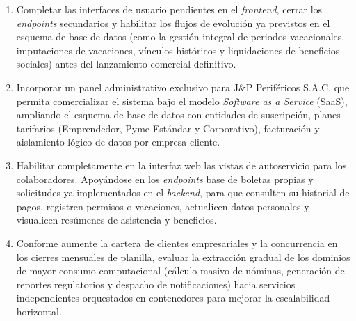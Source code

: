 \begin{enumerate}[leftmargin=*]
    \item Completar las interfaces de usuario 
    pendientes en el \textit{frontend}, cerrar los \textit{endpoints} secundarios y habilitar los flujos de evolución 
    ya previstos en el esquema de base de datos (como la gestión integral de periodos vacacionales, imputaciones de vacaciones, 
    vínculos históricos y liquidaciones de beneficios sociales) antes del lanzamiento comercial definitivo.

    \item Incorporar un panel administrativo exclusivo 
    para J\&P Periféricos S.A.C. que permita comercializar el sistema bajo el modelo \textit{Software as a Service} (SaaS), 
    ampliando el esquema de base de datos con entidades de suscripción, planes tarifarios (Emprendedor, Pyme Estándar y Corporativo), 
    facturación y aislamiento lógico de datos por empresa cliente.

    \item Habilitar completamente en la interfaz web las vistas de 
    autoservicio para los colaboradores. Apoyándose en los \textit{endpoints} base de boletas propias y 
    solicitudes ya implementados en el \textit{backend}, para que consulten su historial de pagos, registren permisos o vacaciones, 
    actualicen datos personales y visualicen resúmenes de asistencia y beneficios.

    \item Conforme aumente la cartera de clientes empresariales y 
    la concurrencia en los cierres mensuales de planilla, evaluar la extracción gradual de los dominios de mayor 
    consumo computacional (cálculo masivo de nóminas, generación de reportes regulatorios y despacho de notificaciones) 
    hacia servicios independientes orquestados en contenedores para mejorar la escalabilidad horizontal.
    
\end{enumerate}